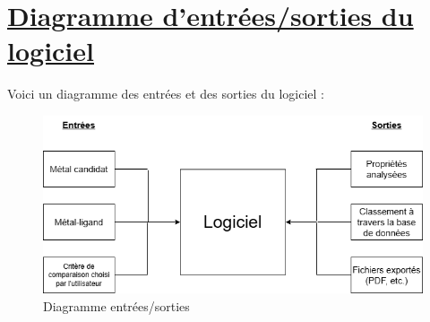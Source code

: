 \documentclass[11pt]{article}
\begin{document}
\section{\underline{Diagramme d'entrées/sorties du logiciel}}
Voici un diagramme des entrées et des sorties du logiciel :

\begin{figure}[h!]
  \includegraphics[width=\linewidth]{Diagramme.png}
  \caption{Diagramme entrées/sorties}
\end{figure}
\end{document}
